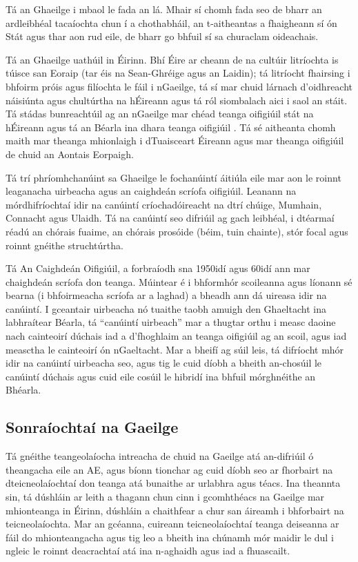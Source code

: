 \begin{multicols}{2}
Tá an Ghaeilge i mbaol le fada an lá. Mhair sí chomh fada seo de bharr an ardleibhéal tacaíochta chun í a chothabháil, an t-aitheantas a fhaigheann sí ón Stát agus thar aon rud eile, de bharr go bhfuil sí sa churaclam oideachais. 


Tá an Ghaeilge uathúil in Éirinn. Bhí Éire ar cheann de na cultúir litríochta is túisce san Eoraip (tar éis na Sean-Ghréige agus an Laidin); tá litríocht fhairsing i bhfoirm próis agus filíochta le fáil i nGaeilge, tá sí mar chuid lárnach d’oidhreacht náisiúnta agus chultúrtha na hÉireann agus tá ról siombalach aici i saol an stáit. Tá stádas bunreachtúil ag an nGaeilge mar chéad teanga oifigiúil stát na hÉireann agus tá an Béarla ina dhara teanga oifigiúil \cite{govtstatement06,20yearstrategy}. Tá sé aitheanta chomh maith mar theanga mhionlaigh i dTuaisceart Éireann agus mar theanga oifigiúil de chuid an Aontais Eorpaigh.

Tá trí phríomhchanúint sa Ghaeilge le fochanúintí áitiúla eile mar aon le roinnt leaganacha uirbeacha agus an caighdeán scríofa oifigiúil. Leanann na mórdhifríochtaí idir na canúintí críochadóireacht na dtrí chúige, Mumhain, Connacht agus Ulaidh. Tá na canúintí seo difriúil ag gach leibhéal, i dtéarmaí réadú an chórais fuaime, an chórais prosóide (béim, tuin chainte), stór focal agus roinnt gnéithe struchtúrtha. 

Tá An Caighdeán Oifigiúil, a forbraíodh sna 1950idí agus 60idí ann mar chaighdeán scríofa don teanga. Múintear é i bhformhór scoileanna agus líonann sé bearna (i bhfoirmeacha scríofa ar a laghad) a bheadh ann dá uireasa idir na canúintí. I gceantair uirbeacha nó tuaithe taobh amuigh den Ghaeltacht ina labhraítear Béarla, tá “canúintí uirbeach” mar a thugtar orthu i measc daoine nach cainteoirí dúchais iad a d’fhoghlaim an teanga oifigiúil ag an scoil, agus iad measctha le cainteoirí ón nGaeltacht. Mar a bheifí ag súil leis, tá difríocht mhór idir na canúintí uirbeacha seo, agus tig le cuid díobh a bheith an-chosúil le canúintí dúchais agus cuid eile cosúil le hibridí ina bhfuil mórghnéithe an Bhéarla. 

\subsection{Sonraíochtaí na Gaeilge}
\label{AboutIrish_ga}

Tá gnéithe teangeolaíocha intreacha de chuid na Gaeilge atá an-difriúil ó theangacha eile an AE, agus bíonn tionchar ag cuid díobh seo ar fhorbairt na dteicneolaíochtaí don teanga atá bunaithe ar urlabhra agus téacs. Ina theannta sin, tá dúshláin ar leith a thagann chun cinn i gcomhthéacs na Gaeilge mar mhionteanga in Éirinn, dúshláin a chaithfear a chur san áireamh i bhforbairt na teicneolaíochta. Mar an gcéanna, cuireann teicneolaíochtaí teanga deiseanna ar fáil do mhionteangacha agus tig leo a bheith ina chúnamh mór maidir le dul i ngleic le roinnt deacrachtaí atá ina n-aghaidh agus iad a fhuascailt.


\end{multicols}
